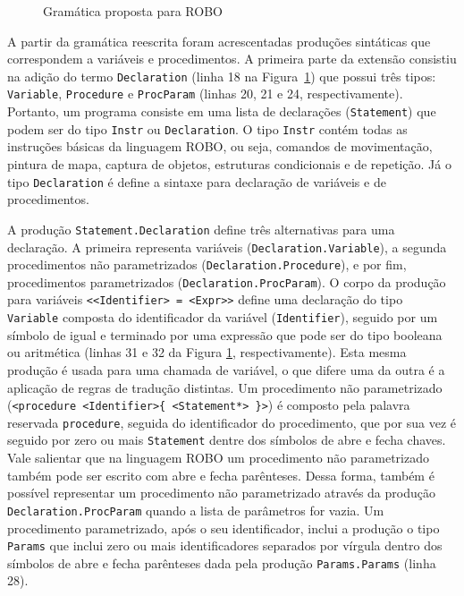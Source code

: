 \begin{figure}[h]
\caption{Gramática proposta para ROBO}

\label{fig:gramatica}
\end{figure}


A partir da gramática reescrita foram acrescentadas produções sintáticas que correspondem a variáveis e procedimentos. A primeira parte da extensão consistiu na adição do termo \texttt{Declaration} (linha 18 na Figura~\ref{fig:gramatica}) que possui três tipos: \texttt{Variable}, \texttt{Procedure} e \texttt{ProcParam} (linhas 20, 21 e 24, respectivamente). Portanto, um programa consiste em uma lista de declarações (\texttt{Statement}) que podem ser do tipo \texttt{Instr} ou \texttt{Declaration}. O tipo \texttt{Instr} contém todas as instruções básicas da linguagem ROBO, ou seja, comandos de movimentação, pintura de mapa, captura de objetos, estruturas condicionais e de repetição.
Já o tipo \texttt{Declaration} é define a sintaxe para declaração de variáveis e de procedimentos. 

 
A produção \texttt{Statement.Declaration} define três alternativas para uma declaração. A primeira representa variáveis (\texttt{Declaration.Variable}), a segunda procedimentos não parametrizados (\texttt{Declaration.Procedure}), e por fim, procedimentos parametrizados (\texttt{Declaration.ProcParam}). O corpo da produção para variáveis \texttt{<<Identifier> = <Expr>>} define uma declaração do tipo \texttt{Variable} composta do identificador da variável (\texttt{Identifier}), seguido por um símbolo de igual e terminado por uma expressão que pode ser do tipo booleana ou aritmética (linhas 31 e 32 da Figura \ref{fig:gramatica}, respectivamente). Esta mesma produção é usada para uma chamada de variável, o que difere uma da outra é a aplicação de regras de tradução distintas. Um procedimento não parametrizado (\texttt{<procedure <Identifier>\{ <Statement*> \}>}) é composto pela palavra reservada \texttt{procedure}, seguida do identificador do procedimento, que por sua vez é seguido por zero ou mais \texttt{Statement} dentre dos símbolos de abre e fecha chaves. Vale salientar que na linguagem ROBO um procedimento não parametrizado também pode ser escrito com abre e fecha parênteses. Dessa forma, também é possível representar um procedimento não parametrizado através da produção \texttt{Declaration.ProcParam} quando a lista de parâmetros for vazia. Um procedimento parametrizado, após o seu identificador, inclui a produção o tipo \texttt{Params} que inclui zero ou mais identificadores separados por vírgula dentro dos símbolos de abre e fecha parênteses dada pela produção \texttt{Params.Params} (linha 28).

